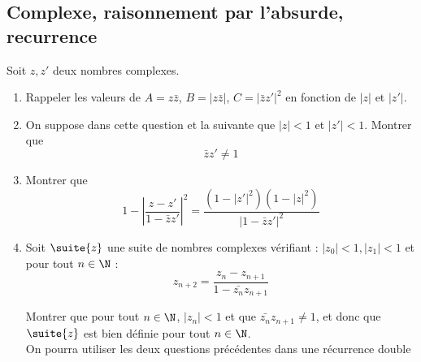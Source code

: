 \subsection{Complexe, raisonnement par l'absurde, recurrence}

\begin{exercice}
Soit $z,z'$ deux nombres complexes.

\begin{enumerate}
\item Rappeler les valeurs de $A=z\bar{z}$, $B=|z\bar{z}|$, $C=|\bar{z}z'|^2$ en fonction de $|z|$ et $|z'|$. 
\item On suppose dans cette question et  la suivante que $|z|<1 $ et $|z' |<1$. Montrer que $$\bar{z}z'\neq 1$$

\item  Montrer que 
$$1- \left| \frac{z-z'}{1-\bar{z} z' } \right|^2 = \frac{(1-|z'|^2)(1-|z|^2)}{|1-\bar{z}z'|^2}$$
\item Soit $\suite{z}$ une suite de nombres complexes vérifiant : $|z_0|<1, |z_1|<1$  et pour tout $n\in \N$ :
$$z_{n+2} =\frac{z_n-z_{n+1}}{1-\bar{z_{n}} z_{n+1}}$$

Montrer que pour tout $n\in \N$, $|z_n|<1$ et que $\bar{z_n}z_{n+1}\neq 1$, et donc que $\suite{z}$ est bien définie pour tout $n\in \N$. \\
\footnotesize{On pourra utiliser les deux questions précédentes dans une récurrence double}

\end{enumerate}
\end{exercice}

